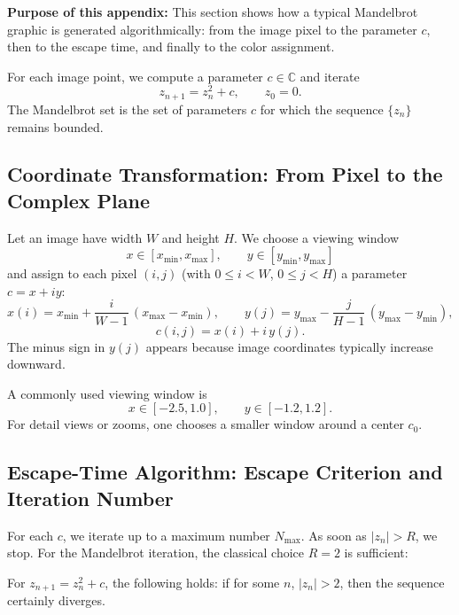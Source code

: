 \textbf{Purpose of this appendix:} This section shows how a typical Mandelbrot graphic is generated algorithmically:
from the image pixel to the parameter \(c\), then to the escape time, and finally to the color assignment.

\begin{MathBox}
	\label{box:mandelbrot-basic-principle}
	For each image point, we compute a parameter \(c\in\mathbb{C}\) and iterate
	\[
	z_{n+1}=z_n^2+c,\qquad z_0=0.
	\]
	The Mandelbrot set is the set of parameters \(c\) for which the sequence \(\{z_n\}\) remains bounded.
\end{MathBox}

\subsection{Coordinate Transformation: From Pixel to the Complex Plane}

Let an image have width \(W\) and height \(H\). We choose a viewing window
\[
x\in[x_{\min},x_{\max}],\qquad y\in[y_{\min},y_{\max}]
\]
and assign to each pixel \((i,j)\) (with \(0\le i<W\), \(0\le j<H\)) a parameter \(c=x+iy\):
\[
x(i)=x_{\min}+\frac{i}{W-1}\,(x_{\max}-x_{\min}),\qquad
y(j)=y_{\max}-\frac{j}{H-1}\,(y_{\max}-y_{\min}),
\]
\[
c(i,j)=x(i)+i\,y(j).
\]
The minus sign in \(y(j)\) appears because image coordinates typically increase downward.

\begin{NoteBox}
	\label{box:mandelbrot-standard-window}
	A commonly used viewing window is
	\[
	x\in[-2.5,1.0],\qquad y\in[-1.2,1.2].
	\]
	For detail views or zooms, one chooses a smaller window around a center \(c_0\).
\end{NoteBox}

\subsection{Escape-Time Algorithm: Escape Criterion and Iteration Number}

For each \(c\), we iterate up to a maximum number \(N_{\max}\). As soon as \(|z_n|>R\), we stop.
For the Mandelbrot iteration, the classical choice \(R=2\) is sufficient:

\begin{MathBox}[Escape Radius \(R=2\)]
	\label{box:mandelbrot-escape-radius}
	For \(z_{n+1}=z_n^2+c\), the following holds: if for some \(n\), \(|z_n|>2\), then the sequence certainly diverges.
\end{MathBox}

